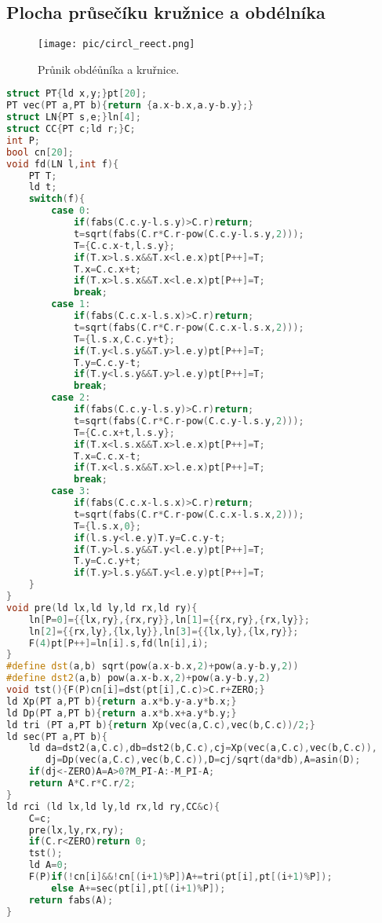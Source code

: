 \documentclass[11pt]{article}
\begin{document}
\subsection{Plocha průsečíku kružnice a obdélníka}
\begin{figure}[H]
  \centering
  \texttt{[image: pic/circl\_reect.png]}
  \caption[Průnik obdélníka a kružnice.]{Průnik obdéůníka a kruřnice.}
\end{figure}
\begin{lstlisting}[language=C++]
struct PT{ld x,y;}pt[20];
PT vec(PT a,PT b){return {a.x-b.x,a.y-b.y};}
struct LN{PT s,e;}ln[4];
struct CC{PT c;ld r;}C;
int P;
bool cn[20];
void fd(LN l,int f){
    PT T;
    ld t;
    switch(f){
        case 0:
            if(fabs(C.c.y-l.s.y)>C.r)return;
            t=sqrt(fabs(C.r*C.r-pow(C.c.y-l.s.y,2)));
            T={C.c.x-t,l.s.y};
            if(T.x>l.s.x&&T.x<l.e.x)pt[P++]=T;
            T.x=C.c.x+t;
            if(T.x>l.s.x&&T.x<l.e.x)pt[P++]=T;
            break;
        case 1:
            if(fabs(C.c.x-l.s.x)>C.r)return;
            t=sqrt(fabs(C.r*C.r-pow(C.c.x-l.s.x,2)));
            T={l.s.x,C.c.y+t};
            if(T.y<l.s.y&&T.y>l.e.y)pt[P++]=T;
            T.y=C.c.y-t;
            if(T.y<l.s.y&&T.y>l.e.y)pt[P++]=T;
            break;
        case 2:
            if(fabs(C.c.y-l.s.y)>C.r)return;
            t=sqrt(fabs(C.r*C.r-pow(C.c.y-l.s.y,2)));
            T={C.c.x+t,l.s.y};
            if(T.x<l.s.x&&T.x>l.e.x)pt[P++]=T;
            T.x=C.c.x-t;
            if(T.x<l.s.x&&T.x>l.e.x)pt[P++]=T;
            break;
        case 3:
            if(fabs(C.c.x-l.s.x)>C.r)return;
            t=sqrt(fabs(C.r*C.r-pow(C.c.x-l.s.x,2)));
            T={l.s.x,0};
            if(l.s.y<l.e.y)T.y=C.c.y-t;
            if(T.y>l.s.y&&T.y<l.e.y)pt[P++]=T;
            T.y=C.c.y+t;
            if(T.y>l.s.y&&T.y<l.e.y)pt[P++]=T;
    }
}
void pre(ld lx,ld ly,ld rx,ld ry){
    ln[P=0]={{lx,ry},{rx,ry}},ln[1]={{rx,ry},{rx,ly}};
    ln[2]={{rx,ly},{lx,ly}},ln[3]={{lx,ly},{lx,ry}};
    F(4)pt[P++]=ln[i].s,fd(ln[i],i);
}
#define dst(a,b) sqrt(pow(a.x-b.x,2)+pow(a.y-b.y,2))
#define dst2(a,b) pow(a.x-b.x,2)+pow(a.y-b.y,2)
void tst(){F(P)cn[i]=dst(pt[i],C.c)>C.r+ZERO;}
ld Xp(PT a,PT b){return a.x*b.y-a.y*b.x;}
ld Dp(PT a,PT b){return a.x*b.x+a.y*b.y;}
ld tri (PT a,PT b){return Xp(vec(a,C.c),vec(b,C.c))/2;}
ld sec(PT a,PT b){
    ld da=dst2(a,C.c),db=dst2(b,C.c),cj=Xp(vec(a,C.c),vec(b,C.c)),
       dj=Dp(vec(a,C.c),vec(b,C.c)),D=cj/sqrt(da*db),A=asin(D);
    if(dj<-ZERO)A=A>0?M_PI-A:-M_PI-A;
    return A*C.r*C.r/2;
}
ld rci (ld lx,ld ly,ld rx,ld ry,CC&c){
    C=c;
    pre(lx,ly,rx,ry);
    if(C.r<ZERO)return 0;
    tst();
    ld A=0;
    F(P)if(!cn[i]&&!cn[(i+1)%P])A+=tri(pt[i],pt[(i+1)%P]);
        else A+=sec(pt[i],pt[(i+1)%P]);
    return fabs(A);
}
\end{lstlisting}
\end{document}
